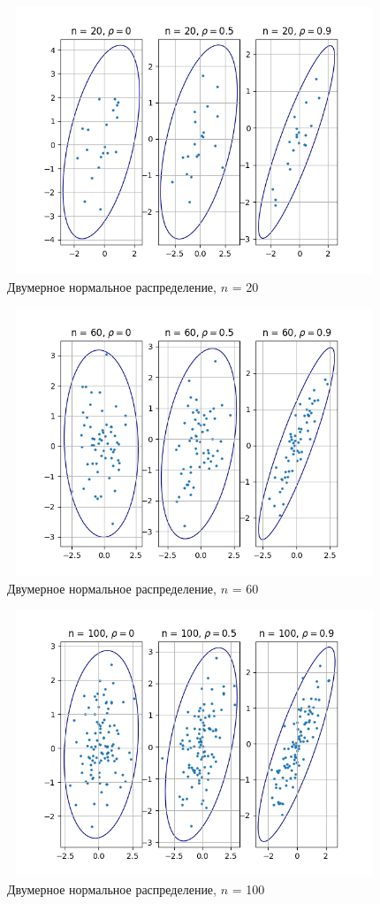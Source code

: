 \documentclass[a4paper]{article}
\begin{document}
	
	\begin{figure}[H]
		\centering
		\includegraphics[width = 13cm, height = 8cm]{bivariate_normal_distribution_n20.png}
		\caption{Двумерное нормальное распределение, $n$ = 20}
		\label{fig:n20}
	\end{figure}
	
	\begin{figure}[H]
		\centering
		\includegraphics[width = 13cm, height = 8cm]{bivariate_normal_distribution_n60.png}
		\caption{Двумерное нормальное распределение, $n$ = 60}
		\label{fig:n60}
	\end{figure}

	\begin{figure}[H]
		\centering
		\includegraphics[width = 13cm, height = 8cm]{bivariate_normal_distribution_n100.png}
		\caption{Двумерное нормальное распределение, $n$ = 100}
		\label{fig:n100}
	\end{figure}
\end{document}

